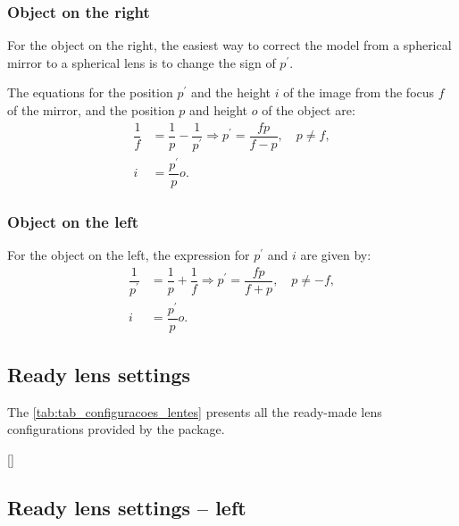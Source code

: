\documentclass[a4paper,10pt]{article}
\begin{document}
\subsubsection{Object on the right}

For the object on the right, the easiest way to correct the model from a spherical mirror to a spherical lens is to change the sign of $p^{\prime}$.

The equations for the position $p^{\prime}$ and the height $i$ of the image from the focus $f$ of the mirror, and the position $p$ and height $o$ of the object are:
\begin{equation}
  \begin{split}
    \dfrac{1}{f} & = \dfrac{1}{p} - \dfrac{1}{p^{\prime}} \Rightarrow p^{\prime} = \dfrac{f p}{f - p}, \quad p \neq f, \\
    i            & = \dfrac{p^{\prime}}{p} o.
  \end{split}
\end{equation}

\subsubsection{Object on the left}

For the object on the left, the expression for $p^{\prime}$ and $i$ are given by:
\begin{equation}
  \begin{split}
    \dfrac{1}{p^{\prime}} & = \dfrac{1}{p} + \dfrac{1}{f} \Rightarrow p^{\prime} = \dfrac{f p}{f + p}, \quad p \neq -f, \\
    i                     & = \dfrac{p^{\prime}}{p} o.
  \end{split}
\end{equation}

\subsection{Ready lens settings}

The \autoref{tab:tab_configuracoes_lentes} presents all the ready-made lens configurations provided by the package.

\begin{table}[ht]
  \centering
  [\linewidth]{
    
  }
\end{table}

\subsection{Ready lens settings -- left}
\end{document}
